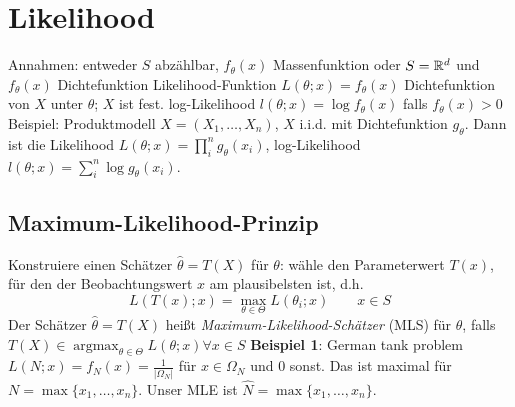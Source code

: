 \newpage 

\section{Likelihood}

\begin{outline}
\0 Annahmen: entweder $S$ abzählbar, $f_\theta(x)$ Massenfunktion oder $S=\mathbb{R}^d$ und $f_\theta(x)$ Dichtefunktion
    \1 Likelihood-Funktion $L(\theta;x)=f_\theta(x)$ Dichtefunktion von $X$ unter $\theta$; $X$ ist fest.
    \1 log-Likelihood $l(\theta;x)=\log f_\theta(x)$ falls $f_\theta(x)> 0$
\0 Beispiel: Produktmodell $X=(X_1,\ldots,X_n)$, $X$ i.i.d. mit Dichtefunktion $g_\theta$. Dann ist die Likelihood $L(\theta;x)=\prod^n_i g_\theta(x_i)$, log-Likelihood $l(\theta;x)=\sum^n_i \log g_\theta(x_i)$.
\end{outline}

\subsection{Maximum-Likelihood-Prinzip}

\begin{outline}
\0 Konstruiere einen Schätzer $\hat{\theta}=T(X)$ für $\theta$: wähle den Parameterwert $T(x)$, für den der Beobachtungswert $x$ am plausibelsten ist, d.h.
$$L(T(x);x)=\max_{\theta\in\Theta}L(\theta_i;x) \qquad x\in S$$
    \1 Der Schätzer $\hat{\theta}=T(X)$ heißt \emph{Maximum-Likelihood-Schätzer} (MLS) für $\theta$, falls $T(X)\in \operatorname{argmax}_{\theta\in\Theta} L(\theta;x) \forall x\in S$
    \1 \textbf{Beispiel 1}: German tank problem
        \2 $L(N;x)=f_N(x)=\frac{1}{|\Omega_N|}$ für $x\in \Omega_N$ und $0$ sonst. Das ist maximal für $N=\max \{x_1,\ldots,x_n\}$. Unser MLE ist $\hat{N}=\max\{x_1,\ldots,x_n\}$.
\end{outline}


